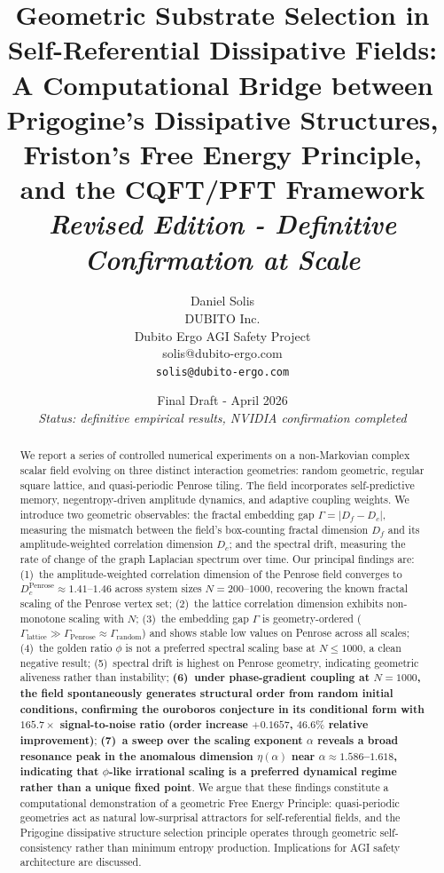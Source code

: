 \documentclass[12pt,a4paper]{article}
\title{%
  \textbf{Geometric Substrate Selection in Self-Referential Dissipative Fields:}\\[4pt]
  \large A Computational Bridge between Prigogine's Dissipative Structures,\\
  Friston's Free Energy Principle, and the CQFT/PFT Framework\\[8pt]
  \large \textit{Revised Edition - Definitive Confirmation at Scale}
}
\author{%
  Daniel Solis\\[4pt]
  \small DUBITO Inc.\\
  \small Dubito Ergo AGI Safety Project\\
  \small solis@dubito-ergo.com\\[4pt]
  \small \texttt{solis@dubito-ergo.com}
}
\date{%
  \small Final Draft - April 2026\\
  \small \textit{Status: definitive empirical results, NVIDIA confirmation completed}
}
\theoremstyle{plain}
\theoremstyle{definition}
\begin{document}
\maketitle
\thispagestyle{empty}
\newpage
\begin{abstract}
We report a series of controlled numerical experiments on a non-Markovian complex
scalar field evolving on three distinct interaction geometries: random geometric,
regular square lattice, and quasi-periodic Penrose tiling. The field incorporates
self-predictive memory, negentropy-driven amplitude dynamics, and adaptive coupling
weights. We introduce two geometric observables: the fractal embedding gap
$\Gamma = |D_f - D_c|$, measuring the mismatch between the field's box-counting
fractal dimension $D_f$ and its amplitude-weighted correlation dimension $D_c$;
and the spectral drift, measuring the rate of change of the graph Laplacian
spectrum over time. Our principal findings are: (1)~the amplitude-weighted
correlation dimension of the Penrose field converges to
$D_c^{\text{Penrose}} \approx 1.41$--$1.46$ across system sizes $N = 200$--$1000$,
recovering the known fractal scaling of the Penrose vertex set; (2)~the lattice
correlation dimension exhibits non-monotone scaling with $N$; (3)~the embedding
gap $\Gamma$ is geometry-ordered
($\Gamma_{\text{lattice}} \gg \Gamma_{\text{Penrose}} \approx \Gamma_{\text{random}}$)
and shows stable low values on Penrose across all scales; (4)~the golden ratio
$\phi$ is not a preferred spectral scaling base at $N \leq 1000$, a clean negative
result; (5)~spectral drift is highest on Penrose geometry, indicating geometric
aliveness rather than instability; \textbf{(6)~under phase-gradient coupling at
$N=1000$, the field spontaneously generates structural order from random initial
conditions, confirming the ouroboros conjecture in its conditional form with
$165.7\times$ signal-to-noise ratio (order increase $+0.1657$, $46.6\%$ relative
improvement)}; \textbf{(7)~a sweep over the scaling exponent $\alpha$ reveals a
broad resonance peak in the anomalous dimension $\eta(\alpha)$ near
$\alpha \approx 1.586$--$1.618$, indicating that $\phi$-like irrational scaling
is a preferred dynamical regime rather than a unique fixed point}. We argue that
these findings constitute a computational demonstration of a geometric Free Energy
Principle: quasi-periodic geometries act as natural low-surprisal attractors for
self-referential fields, and the Prigogine dissipative structure selection principle
operates through geometric self-consistency rather than minimum entropy production.
Implications for AGI safety architecture are discussed.
\end{abstract}
\end{document}
